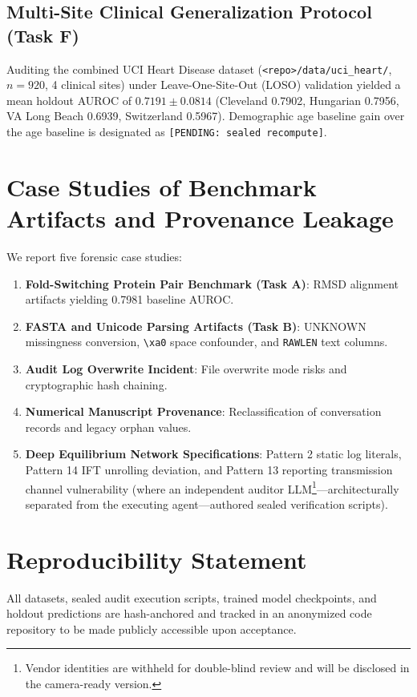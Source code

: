 \documentclass[submittal,11pt]{article}
\begin{document}
\subsection{Multi-Site Clinical Generalization Protocol (Task F)}
Auditing the combined UCI Heart Disease dataset (\texttt{<repo>/data/uci_heart/}, $n=920$, 4 clinical sites) under Leave-One-Site-Out (LOSO) validation yielded a mean holdout AUROC of $0.7191 \pm 0.0814$ (Cleveland 0.7902, Hungarian 0.7956, VA Long Beach 0.6939, Switzerland 0.5967). Demographic age baseline gain over the age baseline is designated as \texttt{[PENDING: sealed recompute]}.

\section{Case Studies of Benchmark Artifacts and Provenance Leakage}
We report five forensic case studies:
\begin{enumerate}
    \item \textbf{Fold-Switching Protein Pair Benchmark (Task A)}: RMSD alignment artifacts yielding 0.7981 baseline AUROC.
    \item \textbf{FASTA and Unicode Parsing Artifacts (Task B)}: UNKNOWN missingness conversion, \texttt{\textbackslash xa0} space confounder, and \texttt{RAWLEN} text columns.
    \item \textbf{Audit Log Overwrite Incident}: File overwrite mode risks and cryptographic hash chaining.
    \item \textbf{Numerical Manuscript Provenance}: Reclassification of conversation records and legacy orphan values.
    \item \textbf{Deep Equilibrium Network Specifications}: Pattern 2 static log literals, Pattern 14 IFT unrolling deviation, and Pattern 13 reporting transmission channel vulnerability (where an independent auditor LLM\footnote{Vendor identities are withheld for double-blind review and will be disclosed in the camera-ready version.}—architecturally separated from the executing agent—authored sealed verification scripts).
\end{enumerate}

\section{Reproducibility Statement}
All datasets, sealed audit execution scripts, trained model checkpoints, and holdout predictions are hash-anchored and tracked in an anonymized code repository to be made publicly accessible upon acceptance.
\end{document}
